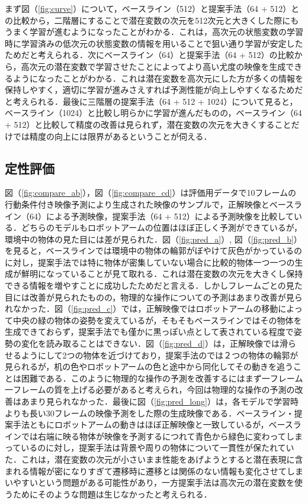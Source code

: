 \documentclass[10pt, twocolumn]{jarticle}
\begin{document}
まず図（\ref{fig:curve}）について，ベースライン（512）と提案手法（64 + 512）との比較から，二階層にすることで潜在変数の次元を512次元と大きくした際にもうまく学習が進むようになったことがわかる．これは，高次元の状態変数の学習時に学習済みの低次元の状態変数の情報を用いることで狙い通り学習が安定したためだと考えられる．次にベースライン（64）と提案手法（64 + 512）の比較から，高次元の潜在変数で学習させたことによってより高い尤度の映像を生成できるようになったことがわかる．これは潜在変数を高次元にした方が多くの情報を保持しやすく，適切に学習が進みさえすれば予測性能が向上しやすくなるためだと考えられる．最後に三階層の提案手法（64 + 512 + 1024）について見ると，ベースライン（1024）と比較し明らかに学習が進んだものの，ベースライン（64 + 512）と比較して精度の改善は見られず，潜在変数の次元を大きくすることだけでは精度の向上には限界があるということが伺える．

\subsection{定性評価}
図（\ref{fig:compare_ab}），図（\ref{fig:compare_cd}）は評価用データで10フレームの行動条件付き映像予測により生成された映像のサンプルで，正解映像とベースライン（64）による予測映像，提案手法（64 + 512）による予測映像を比較している．どちらのモデルもロボットアームの位置はほぼ正しく予測ができているが，環境中の物体の見た目には差が見られた．図（\ref{fig:pred_a}）, 図（\ref{fig:pred_b}）を見ると，ベースラインでは環境中の物体の輪郭がぼやけて灰色がかっているのに対し，提案手法では特に物体が密集していない場合に比較的物体一つ一つの生成が鮮明になっていることが見て取れる．これは潜在変数の次元を大きくし保持できる情報を増やすことに成功したためだと言える．しかしフレームごとの見た目には改善が見られたものの，物理的な操作についての予測はあまり改善が見られなかった．図（\ref{fig:pred_c}）では，正解映像ではロボットアームの移動によって中央の緑の物体の姿勢を変えているが，そもそもベースラインではその物体を生成できておらず，提案手法でも僅かに黒っぽい点として表されている程度で姿勢の変化を読み取ることはできない．図（\ref{fig:pred_d}）は，正解映像では滑らせるようにして2つの物体を近づけており，提案手法のでは２つの物体の輪郭が見られるが，机の色やロボットアームの色と途中から同化してその動きを追うことは困難である．このように物理的な操作の予測を改善するにはまず一フレーム一フレームの質を上げる必要があると考えられ，今回は物理的な操作の予測の改善はあまり見られなかった．最後に図（\ref{fig:pred_long}）は，各モデルで学習時よりも長い30フレームの映像予測をした際の生成映像である．ベースライン・提案手法ともにロボットアームの動きはほぼ正解映像と一致しているが，ベースラインでは右端に映る物体が映像を予測するにつれて青色から緑色に変わってしまっているのに対し，提案手法は背景や周りの物体について一貫性が保たれていた．これは，潜在変数の次元が小さいまま性能をあげようとすると潜在表現に含まれる情報が密になりすぎて遷移時に遷移とは関係のない情報も変化させてしまいやすいという問題がある可能性があり，一方提案手法は高次元の潜在変数を使うためにそのような問題は生じなかったと考えられる．
\end{document}

